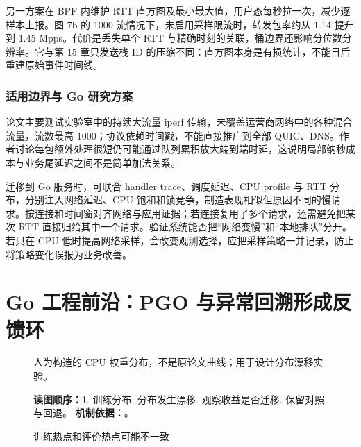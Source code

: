 \documentclass[UTF8,fontset=fandol,openany,11pt]{ctexbook}
\begin{document}
另一方案在 BPF 内维护 RTT 直方图及最小最大值，用户态每秒拉一次，减少逐样本上报。图 7b 的 1000 流情况下，未启用采样限流时，转发包率约从 1.14 提升到 1.45 Mpps。代价是丢失单个 RTT 与精确时刻的关联，桶边界还影响分位数分辨率。它与第 15 章只发送栈 ID 的压缩不同：直方图本身是有损统计，不能日后重建原始事件时间线。

\subsubsection{适用边界与 Go 研究方案}
论文主要测试实验室中的持续大流量 iperf 传输，未覆盖运营商网络中的各种混合流量，流数最高 1000；协议依赖时间戳，不能直接推广到全部 QUIC、DNS。作者讨论每包额外处理很短仍可能通过队列累积放大端到端时延，这说明局部纳秒成本与业务尾延迟之间不是简单加法关系。

迁移到 Go 服务时，可联合 handler trace、调度延迟、CPU profile 与 RTT 分布，分别注入网络延迟、CPU 饱和和锁竞争，制造表现相似但原因不同的慢请求。按连接和时间窗对齐网络与应用证据；若连接复用了多个请求，还需避免把某次 RTT 直接归给其中一个请求。验证系统能否把“网络变慢”和“本地排队”分开。若只在 CPU 低时提高网络采样，会改变观测选择，应把采样策略一并记录，防止将策略变化误报为业务改善。

\section{Go 工程前沿：PGO 与异常回溯形成反馈环}
\begin{figure}[H]
\centering
{}
\caption{训练热点和评价热点可能不一致}\label{fig:16-pgo-drift}
\begin{minipage}{0.96\linewidth}\footnotesize 人为构造的 CPU 权重分布，不是原论文曲线；用于设计分布漂移实验。

\textbf{读图顺序：}1. 训练分布. 分布发生漂移. 观察收益是否迁移. 保留对照与回退。
\textbf{机制依据：}\cite{go-pgo}\cite{front-go121}。
\end{minipage}
\end{figure}
\end{document}
